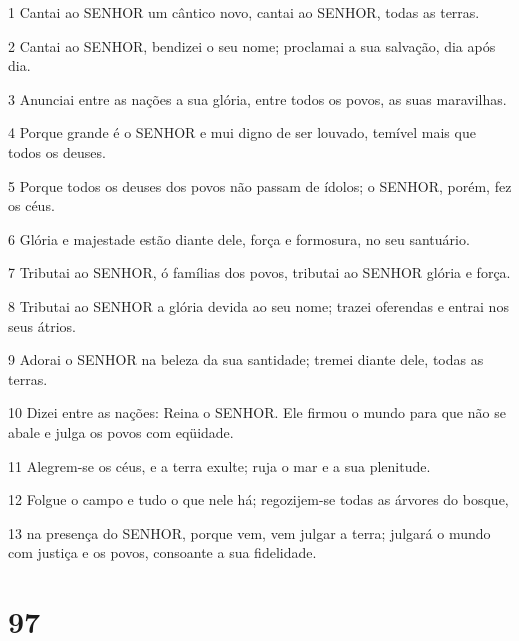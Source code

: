 \par 1 Cantai ao SENHOR um cântico novo, cantai ao SENHOR, todas as terras.
\par 2 Cantai ao SENHOR, bendizei o seu nome; proclamai a sua salvação, dia após dia.
\par 3 Anunciai entre as nações a sua glória, entre todos os povos, as suas maravilhas.
\par 4 Porque grande é o SENHOR e mui digno de ser louvado, temível mais que todos os deuses.
\par 5 Porque todos os deuses dos povos não passam de ídolos; o SENHOR, porém, fez os céus.
\par 6 Glória e majestade estão diante dele, força e formosura, no seu santuário.
\par 7 Tributai ao SENHOR, ó famílias dos povos, tributai ao SENHOR glória e força.
\par 8 Tributai ao SENHOR a glória devida ao seu nome; trazei oferendas e entrai nos seus átrios.
\par 9 Adorai o SENHOR na beleza da sua santidade; tremei diante dele, todas as terras.
\par 10 Dizei entre as nações: Reina o SENHOR. Ele firmou o mundo para que não se abale e julga os povos com eqüidade.
\par 11 Alegrem-se os céus, e a terra exulte; ruja o mar e a sua plenitude.
\par 12 Folgue o campo e tudo o que nele há; regozijem-se todas as árvores do bosque,
\par 13 na presença do SENHOR, porque vem, vem julgar a terra; julgará o mundo com justiça e os povos, consoante a sua fidelidade.

\chapter{97}

